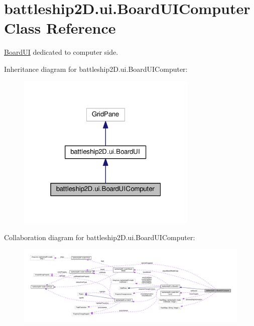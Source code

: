 \hypertarget{classbattleship2D_1_1ui_1_1BoardUIComputer}{\section{battleship2\-D.\-ui.\-Board\-U\-I\-Computer Class Reference}
\label{classbattleship2D_1_1ui_1_1BoardUIComputer}
}


\hyperlink{classbattleship2D_1_1ui_1_1BoardUI}{Board\-U\-I} dedicated to computer side.  




Inheritance diagram for battleship2\-D.\-ui.\-Board\-U\-I\-Computer\-:\nopagebreak
\begin{figure}[H]
\begin{center}
\leavevmode
\includegraphics[width=244pt]{classbattleship2D_1_1ui_1_1BoardUIComputer__inherit__graph}
\end{center}
\end{figure}


Collaboration diagram for battleship2\-D.\-ui.\-Board\-U\-I\-Computer\-:\nopagebreak
\begin{figure}[H]
\begin{center}
\leavevmode
\includegraphics[width=350pt]{classbattleship2D_1_1ui_1_1BoardUIComputer__coll__graph}
\end{center}
\end{figure}
